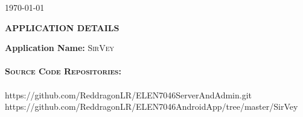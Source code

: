 \documentclass[12pt]{witseiepaper}
\begin{document}
\begin{titlepage}
\begin{center}
    {\large \today}\\[2cm]
    
  \end{center}
  \large


  \textbf{}
\end{titlepage}





 \thispagestyle{empty}\pagestyle{empty}
 \begin{center}
  \textsc{\bfseries APPLICATION DETAILS} \\ [1.0cm]
 \end{center}


  \textbf{Application Name:} \textsc{SirVey} \\
   \\
   \textbf{\textsc{Source Code Repositories:}}\\
   \\
	https://github.com/ReddragonLR/ELEN7046ServerAndAdmin.git \\
	https://github.com/ReddragonLR/ELEN7046AndroidApp/tree/master/SirVey \\
\end{document}
